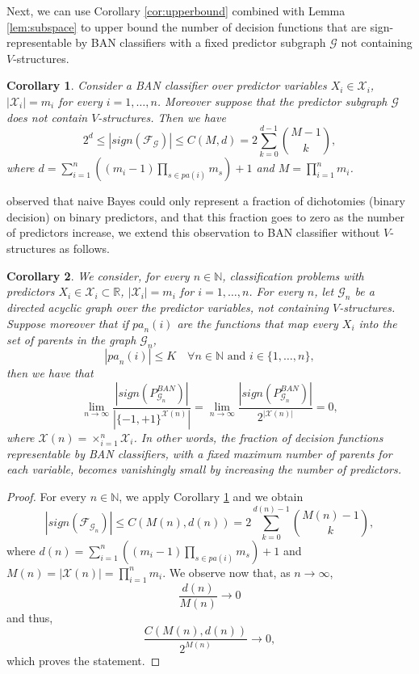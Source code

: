 \documentclass[11pt,a4paper, twoside]{book}
\newtheorem{corollary}{Corollary}[chapter]
\newcommand{\bchi}{\boldsymbol{\mathcal{X}}}
\newcommand{\nchi}{\mathcal{X}}
\begin{document}
Next, we can use Corollary \ref{cor:upperbound} combined with Lemma \ref{lem:subspace} to upper bound the number of decision functions that are sign-representable by BAN classifiers with a fixed predictor subgraph $\mathcal{G}$ not containing $V$-structures.
\begin{corollary}
\label{cor:bounding}
Consider a BAN classifier over predictor variables $X_i\in\nchi_i$, $|\nchi_i|=m_i$ for every $i=1,\ldots,n$. Moreover suppose that the predictor subgraph $\mathcal{G}$ does not contain $V$-structures. Then we have
\[ 2^d \leq |sign(\mathcal{F}_{\mathcal{G}})|\leq C(M,d)=2\sum_{k=0}^{d-1}{M-1 \choose k }, \]
where $d=\sum_{i=1}^n \left( (m_i-1)\prod_{s \in  {pa}(i)} m_s \right)+1$ and $M=\prod_{i=1}^n m_i$.
\end{corollary}

\citet{peot} observed that naive Bayes could only represent a fraction of dichotomies (binary decision) on binary predictors, and that this fraction goes to zero as the number of predictors increase, we extend this observation to BAN classifier without $V$-structures as follows.
\begin{corollary}
We consider, for every $n\in \mathbb{N}$, classification problems with predictors $X_i\in \nchi_i\subset \mathbb{R}$, $|\nchi_i|=m_i$ for $i=1,\ldots,n$. For every $n$, let $\mathcal{G}_n$ be a directed acyclic graph over the predictor variables, not containing $V$-structures. Suppose moreover that if $ {pa}_n(i)$ are the functions that map every $X_i$ into the set of parents in the graph $\mathcal{G}_n$,
\[ \left| {pa}_n(i)\right|\leq K  \quad \forall n\in\mathbb{N} \text{ and } i \in \{1,\ldots,n \},  \]
then we have that
\[ \lim_{n \to \infty} \frac{\left|sign\left(P^{BAN}_{\mathcal{G}_n}\right)\right|}{\left|\{-1,+1\}^{\bchi(n)}\right|}=\lim_{n \to \infty} \frac{\left|sign\left(P^{BAN}_{\mathcal{G}_n}\right)\right|}{2^{|\bchi(n)|}}=0,\] 
where $\bchi(n)=\times_{i=1}^{n} \nchi_i$.
In other words, the fraction of decision functions representable by BAN classifiers, with a fixed maximum number of parents for each variable, becomes vanishingly small by increasing the number of predictors.     
\end{corollary}
\begin{proof}
For every $n\in\mathbb{N}$, we apply Corollary \ref{cor:bounding} and we obtain
\[ \left|sign\left(\mathcal{F}_{\mathcal{G}_n}\right)\right|\leq C\left(M(n),d(n)\right)=2\sum_{k=0}^{d(n)-1}{M(n)-1 \choose k }, \]
where $d(n)=\sum_{i=1}^n \left( (m_i-1)\prod_{s \in  {pa}(i)} m_s \right)+1$ and $M(n)=|\bchi(n)|=\prod_{i=1}^n m_i$.
We observe now that, as $n \to \infty$, 
\[ \frac{d(n)}{M(n)} \to 0 \]
and thus,
\[ \frac{C(M(n),d(n))}{2^{M(n)}} \to 0, \]
which proves the statement.
\end{proof}
\end{document}
